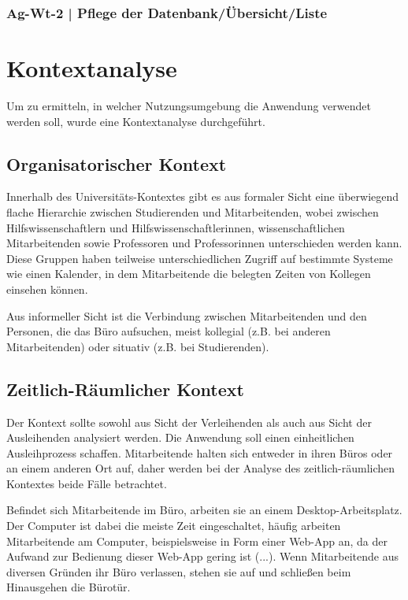 \subsubsection*{Ag-Wt-2 | Pflege der Datenbank/Übersicht/Liste}




\section{Kontextanalyse}
\label{section:kontext}

Um zu ermitteln, in welcher Nutzungsumgebung die Anwendung verwendet werden soll, wurde eine
Kontextanalyse durchgeführt.

\subsection*{Organisatorischer Kontext}
Innerhalb des Universitäts-Kontextes gibt es aus formaler Sicht eine überwiegend flache Hierarchie
zwischen Studierenden und Mitarbeitenden, wobei zwischen Hilfswissenschaftlern und
Hilfswissenschaftlerinnen, wissenschaftlichen Mitarbeitenden sowie Professoren und Professorinnen
unterschieden werden kann. Diese Gruppen haben teilweise unterschiedlichen Zugriff auf bestimmte
Systeme wie einen Kalender, in dem Mitarbeitende die belegten Zeiten von Kollegen einsehen können.

Aus informeller Sicht ist die Verbindung zwischen Mitarbeitenden und den Personen, die das Büro
aufsuchen, meist kollegial (z.B. bei anderen Mitarbeitenden) oder situativ (z.B. bei Studierenden).

\subsection*{Zeitlich-Räumlicher Kontext}
\label{section:zeit}
Der Kontext sollte sowohl aus Sicht der Verleihenden als auch aus Sicht der Ausleihenden analysiert
werden. Die Anwendung soll einen einheitlichen Ausleihprozess schaffen. Mitarbeitende halten sich
entweder in ihren Büros oder an einem anderen Ort auf, daher werden bei der Analyse des
zeitlich-räumlichen Kontextes beide Fälle betrachtet.

Befindet sich Mitarbeitende im Büro, arbeiten sie an einem Desktop-Arbeitsplatz. Der Computer ist
dabei die meiste Zeit eingeschaltet, häufig arbeiten Mitarbeitende am Computer, beispielsweise in
Form einer Web-App an, da der Aufwand zur Bedienung dieser Web-App gering ist (...). Wenn
Mitarbeitende aus diversen Gründen ihr Büro verlassen, stehen sie auf und schließen beim Hinausgehen
die Bürotür.

